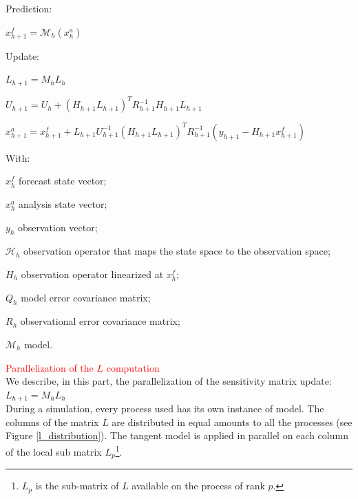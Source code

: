 \begin{DoxyEnumerate}
\item \-Prediction\-:
\begin{DoxyItemize}
\item $ x_{h+1}^f = \mathcal{M}_{h}(x_{h}^{a})$\par

\end{DoxyItemize}
\item \-Update\-:
\begin{DoxyItemize}
\item $ L_{h+1} = M_{h}L_h$\par

\item $ U_{h+1} = U_h + (H_{h+1}L_{h+1})^T R_{h+1}^{-1} H_{h+1}L_{h+1}$\par

\item $ x_{h+1}^a = x_{h+1}^f + L_{h+1}U_{h+1}^{-1}(H_{h+1}L_{h+1})^T R_{h+1}^{-1} (y_{h+1}-H_{h+1}x_{h+1}^f)$\par

\end{DoxyItemize}
\end{DoxyEnumerate}\-With\-: \par
 $x_h^f$ forecast state vector; \par
 $x_h^a$ analysis state vector; \par
 $y_h$ observation vector; \par
 $\mathcal{H}_h$ observation operator that maps the state space to the observation space; \par
 $H_h$ observation operator linearized at $x^f_h$; \par
 $Q_h$ model error covariance matrix; \par
 $R_h$ observational error covariance matrix; \par
 $\mathcal{M}_h$ model.\par



 \par \textcolor{red}{Parallelization of the $L$ computation}\\


We describe, in this part, the parallelization of the sensitivity matrix update:\\
 $ L_{h+1} = M_{h}L_h$\\

 During a simulation, every process used has its own instance of model. The columns of the matrix $L$ are distributed in equal amounts to all the processes (see Figure \ref{l_distribution}). The tangent model is applied in parallel on each column of the local sub matrix $L_p$\footnote{$L_p$ is the sub-matrix of $L$ available on the process of rank $p$.}.

